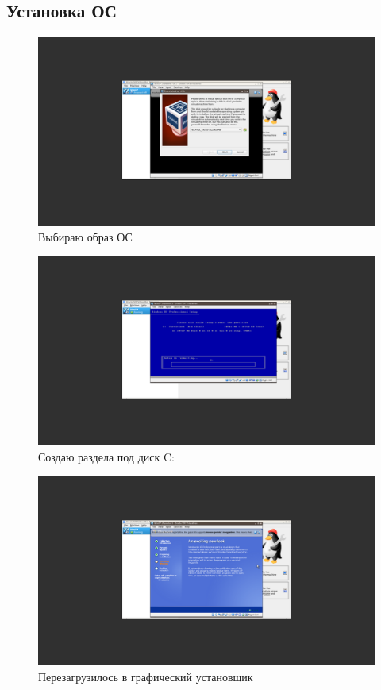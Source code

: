 \documentclass[a4paper]{article}
\begin{document}
\subsection{Установка ОС}
\begin{figure}[H]
    \centering
    \includegraphics[width=\linewidth]{13.png}
    \caption{Выбираю образ ОС}
\end{figure}

\begin{figure}[H]
    \centering
    \includegraphics[width=\linewidth]{15.png}
    \caption{Создаю раздела под диск C:}
\end{figure}

\begin{figure}[H]
    \centering
    \includegraphics[width=\linewidth]{16.png}
    \caption{Перезагрузилось в графический установщик}
\end{figure}
\end{document}

